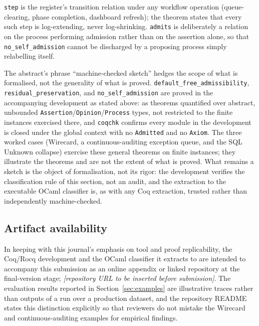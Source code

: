 \documentclass[smallcondensed,envcountsect,natbib]{svjour3}
\newcommand{\state}[1]{\textsf{#1}}
\begin{document}
\texttt{step} is the register's transition relation under any workflow operation (queue-clearing, phase completion, dashboard refresh); the theorem states that every such step is log-extending, never log-shrinking. \texttt{admits} is deliberately a relation on the process performing admission rather than on the assertion alone, so that \texttt{no\_self\_admission} cannot be discharged by a proposing process simply relabelling itself.

\begin{remark}
The abstract's phrase ``machine-checked sketch'' hedges the scope of what is formalised, not the generality of what is proved. \texttt{default\_free\_admissibility}, \texttt{residual\_preservation}, and \texttt{no\_self\_admission} are proved in the accompanying development as stated above: as theorems quantified over abstract, unbounded \texttt{Assertion}/\texttt{Opinion}/\texttt{Process} types, not restricted to the finite instances exercised there, and \texttt{coqchk} confirms every module in the development is closed under the global context with no \texttt{Admitted} and no \texttt{Axiom}. The three worked cases (Wirecard, a continuous-auditing exception queue, and the SQL \state{Unknown} collapse) exercise these general theorems on finite instances; they illustrate the theorems and are not the extent of what is proved. What remains a sketch is the object of formalisation, not its rigor: the development verifies the classification rule of this section, not an audit, and the extraction to the executable OCaml classifier is, as with any Coq extraction, trusted rather than independently machine-checked.
\end{remark}

\subsection*{Artifact availability}
In keeping with this journal's emphasis on tool and proof replicability, the Coq/Rocq development and the OCaml classifier it extracts to are intended to accompany this submission as an online appendix or linked repository at the final-version stage; \emph{[repository URL to be inserted before submission]}. The evaluation results reported in Section~\ref{sec:examples} are illustrative traces rather than outputs of a run over a production dataset, and the repository README states this distinction explicitly so that reviewers do not mistake the Wirecard and continuous-auditing examples for empirical findings.
\end{document}
